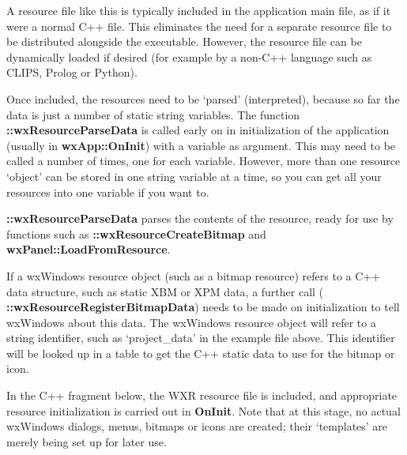 
A resource file like this is typically included in the application main file,
as if it were a normal C++ file. This eliminates the need for a separate
resource file to be distributed alongside the executable. However, the
resource file can be dynamically loaded if desired (for example by a non-C++
language such as CLIPS, Prolog or Python).

Once included, the resources need to be `parsed' (interpreted), because
so far the data is just a number of static string variables. The function\rtfsp
{\bf ::wxResourceParseData} is called early on in initialization of the application
(usually in {\bf wxApp::OnInit}) with a variable as argument. This may need to be
called a number of times, one for each variable. However, more than one
resource `object' can be stored in one string variable at a time, so you can
get all your resources into one variable if you want to.

{\bf ::wxResourceParseData} parses the contents of the resource, ready for use
by functions such as {\bf ::wxResourceCreateBitmap} and {\bf wxPanel::LoadFromResource}.

If a wxWindows resource object (such as a bitmap resource) refers to a
C++ data structure, such as static XBM or XPM data, a further call ({\bf
::wxResourceRegisterBitmapData}) needs to be made on initialization to tell
wxWindows about this data. The wxWindows resource object will refer to a
string identifier, such as `project\_data' in the example file above.
This identifier will be looked up in a table to get the C++ static data
to use for the bitmap or icon.

In the C++ fragment below, the WXR resource file is included,
and appropriate resource initialization is carried out in {\bf OnInit}.
Note that at this stage, no actual wxWindows dialogs, menus, bitmaps or
icons are created; their `templates' are merely being set up for later
use.

